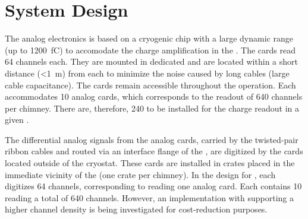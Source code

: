 \section{System Design}
\label{sec:dp-tpcelec-design}


The   analog electronics is based on a cryogenic  chip with a large dynamic range (up to \SI{1200}{\femto\coulomb}) to accomodate the charge amplification in the %
{}. The  cards read \num{64}  channels each. They are mounted in dedicated   and are located within a short distance (\SI{<1}{\metre}) from each  to minimize the noise caused by long cables (large cable capacitance). The cards remain accessible throughout the  operation. Each  %
accommodates \num{10}  analog cards, which corresponds to the readout of \num{640}  channels per chimney. There are, therefore, \num{240}  to be installed for the charge readout in a given .   

The differential analog signals from the analog  cards, carried by the twisted-pair ribbon cables and routed via an interface flange of the , are digitized by the  cards located %
outside of the cryostat. These cards are %
installed in  crates placed in the immediate vicinity of the  (one crate per chimney). %
In the design for , each  digitizes \num{64} channels, corresponding to reading one  analog card. Each   contains \num{10}  reading a total of \num{640} channels. However, an implementation with  supporting a higher channel density is being investigated for cost-reduction purposes. 

